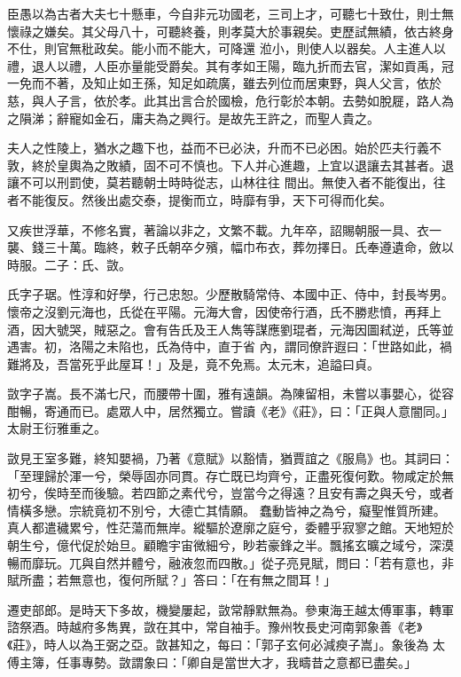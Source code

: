 \begin{pinyinscope}
 臣愚以為古者大夫七十懸車，今自非元功國老，三司上才，可聽七十致仕，則士無懷祿之嫌矣。其父母八十，可聽終養，則孝莫大於事親矣。吏歷試無績，依古終身不仕，則官無秕政矣。能小而不能大，可降還
 涖小，則使人以器矣。人主進人以禮，退人以禮，人臣亦量能受爵矣。其有孝如王陽，臨九折而去官，潔如貢禹，冠一免而不著，及知止如王孫，知足如疏廣，雖去列位而居東野，與人父言，依於慈，與人子言，依於孝。此其出言合於國檢，危行彰於本朝。去勢如脫屣，路人為之隕涕；辭寵如金石，庸夫為之興行。是故先王許之，而聖人貴之。



 夫人之性陵上，猶水之趣下也，益而不已必決，升而不已必困。始於匹夫行義不敦，終於皇輿為之敗績，固不可不慎也。下人并心進趣，上宜以退讓去其甚者。退讓不可以刑罰使，莫若聽朝士時時從志，山林往往
 間出。無使入者不能復出，往者不能復反。然後出處交泰，提衡而立，時靡有爭，天下可得而化矣。



 又疾世浮華，不修名實，著論以非之，文繁不載。九年卒，詔賜朝服一具、衣一襲、錢三十萬。臨終，敕子氏朝卒夕殯，幅巾布衣，葬勿擇日。氏奉遵遺命，斂以時服。二子：氏、敳。



 氏字子琚。性淳和好學，行己忠恕。少歷散騎常侍、本國中正、侍中，封長岑男。懷帝之沒劉元海也，氏從在平陽。元海大會，因使帝行酒，氏不勝悲憤，再拜上酒，因大號哭，賊惡之。會有告氏及王人雋等謀應劉琨者，元海因圖弒逆，氏等並遇害。初，洛陽之未陷也，氏為侍中，直于省
 內，謂同僚許遐曰：「世路如此，禍難將及，吾當死乎此屋耳！」及是，竟不免焉。太元末，追謚曰貞。



 敳字子嵩。長不滿七尺，而腰帶十圍，雅有遠韻。為陳留相，未嘗以事嬰心，從容酣暢，寄通而已。處眾人中，居然獨立。嘗讀《老》《莊》，曰：「正與人意闇同。」太尉王衍雅重之。



 敳見王室多難，終知嬰禍，乃著《意賦》以豁情，猶賈誼之《服鳥》也。其詞曰：「至理歸於渾一兮，榮辱固亦同貫。存亡既已均齊兮，正盡死復何歎。物咸定於無初兮，俟時至而後驗。若四節之素代兮，豈當今之得遠？且安有壽之與夭兮，或者情橫多戀。宗統竟初不別兮，大德亡其情願。
 蠢動皆神之為兮，癡聖惟質所建。真人都遣穢累兮，性茫蕩而無岸。縱驅於遼廓之庭兮，委體乎寂寥之館。天地短於朝生兮，億代促於始旦。顧瞻宇宙微細兮，眇若豪鋒之半。飄搖玄曠之域兮，深漠暢而靡玩。兀與自然并體兮，融液忽而四散。」從子亮見賦，問曰：「若有意也，非賦所盡；若無意也，復何所賦？」答曰：「在有無之間耳！」



 遷吏部郎。是時天下多故，機變屢起，敳常靜默無為。參東海王越太傅軍事，轉軍諮祭酒。時越府多雋異，敳在其中，常自袖手。豫州牧長史河南郭象善《老》《莊》，時人以為王弼之亞。敳甚知之，每曰：「郭子玄何必減瘐子嵩」。象後為
 太傅主簿，任事專勢。敳謂象曰：「卿自是當世大才，我疇昔之意都已盡矣。」




\end{pinyinscope}
